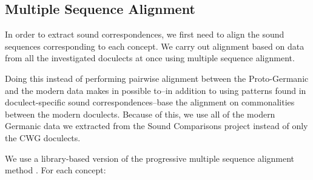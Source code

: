 \documentclass[a4paper]{article}
\begin{document}
\subsection{Multiple Sequence Alignment}
\label{subsec:msa}

In order to extract sound correspondences,
we first need to align the sound sequences corresponding to each concept.
We carry out alignment based on data from
all the investigated doculects at once using multiple sequence alignment.

Doing this instead of performing pairwise alignment between
the Proto-Germanic and the modern data makes in possible
to--in addition to using patterns found in doculect-specific
sound correspondences--base the alignment on commonalities
between the modern doculects.
Because of this, we use all of the modern Germanic data
we extracted from the Sound Comparisons project
instead of only the CWG doculects.

We use a library-based version \citep{notredame2000t-coffee:} of the progressive multiple sequence alignment method \citep{thompson1994clustal}.
For each concept:
\end{document}
